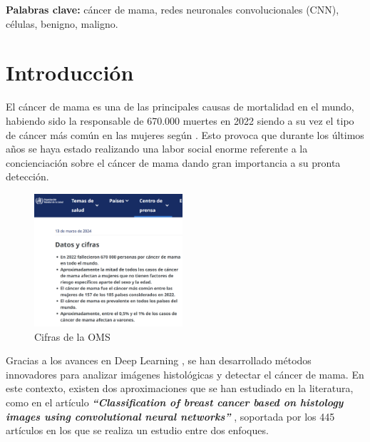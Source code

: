 \documentclass[12pt]{article} %
\begin{document}
\vspace{.5cm}

\textbf{Palabras clave:} cáncer de mama, redes neuronales convolucionales (CNN), células, benigno, maligno.

\newpage
\tableofcontents

\newpage

\section{Introducción}
El cáncer de mama es una de las principales causas de mortalidad en el mundo, habiendo sido la responsable de 670.000 muertes en 2022 siendo a su vez el tipo de cáncer más común en las mujeres según \cite{who_breast_cancer}. Esto provoca que durante los últimos años se haya estado realizando una labor social enorme referente a la concienciación sobre el cáncer de mama dando gran importancia a su pronta detección.\\

\begin{figure}[!ht]
    \centering
    \includegraphics[width=0.49\textwidth]{introduccion.png}
    \caption{Cifras de la OMS \cite{who_breast_cancer}}
    \label{fig:OMS}
\end{figure}

Gracias a los avances en Deep Learning \cite{shinde2018review}, se han desarrollado métodos innovadores para analizar imágenes histológicas y detectar el cáncer de mama. En este contexto, existen dos aproximaciones que se han estudiado en la literatura, como en el artículo \textit{\textbf{“Classification of breast cancer based on histology images using convolutional neural networks”}} \cite{bardou2018classification}, soportada por los 445 artículos en los que se realiza un estudio entre dos enfoques.\\
\end{document}
